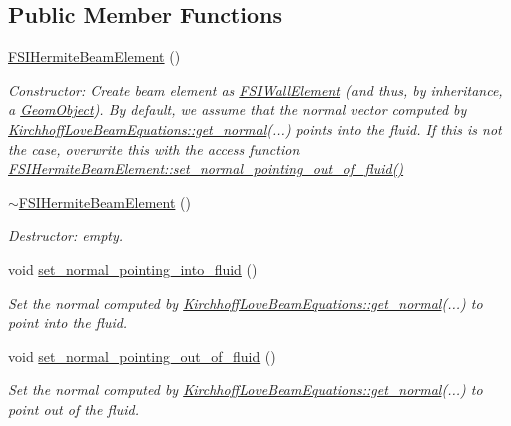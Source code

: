 \subsection*{Public Member Functions}
\begin{DoxyCompactItemize}
\item 
\hyperlink{classoomph_1_1FSIHermiteBeamElement_a40aec23a3e79d2bfcf3a54ab820a7d9b}{F\+S\+I\+Hermite\+Beam\+Element} ()
\begin{DoxyCompactList}\small\item\em Constructor\+: Create beam element as \hyperlink{classoomph_1_1FSIWallElement}{F\+S\+I\+Wall\+Element} (and thus, by inheritance, a \hyperlink{classoomph_1_1GeomObject}{Geom\+Object}). By default, we assume that the normal vector computed by \hyperlink{classoomph_1_1KirchhoffLoveBeamEquations_a963a2ffb3c4008e3b9c175fc1d2d94cc}{Kirchhoff\+Love\+Beam\+Equations\+::get\+\_\+normal}(...) points into the fluid. If this is not the case, overwrite this with the access function \hyperlink{classoomph_1_1FSIHermiteBeamElement_ad509b18e5fd5aae35a86f5c4372d3478}{F\+S\+I\+Hermite\+Beam\+Element\+::set\+\_\+normal\+\_\+pointing\+\_\+out\+\_\+of\+\_\+fluid()} \end{DoxyCompactList}\item 
\hyperlink{classoomph_1_1FSIHermiteBeamElement_a744c7830f87fadc434be57d6fc45bf03}{$\sim$\+F\+S\+I\+Hermite\+Beam\+Element} ()
\begin{DoxyCompactList}\small\item\em Destructor\+: empty. \end{DoxyCompactList}\item 
void \hyperlink{classoomph_1_1FSIHermiteBeamElement_a6acb9e382d0cf3636848e7493c36a3a3}{set\+\_\+normal\+\_\+pointing\+\_\+into\+\_\+fluid} ()
\begin{DoxyCompactList}\small\item\em Set the normal computed by \hyperlink{classoomph_1_1KirchhoffLoveBeamEquations_a963a2ffb3c4008e3b9c175fc1d2d94cc}{Kirchhoff\+Love\+Beam\+Equations\+::get\+\_\+normal}(...) to point into the fluid. \end{DoxyCompactList}\item 
void \hyperlink{classoomph_1_1FSIHermiteBeamElement_ad509b18e5fd5aae35a86f5c4372d3478}{set\+\_\+normal\+\_\+pointing\+\_\+out\+\_\+of\+\_\+fluid} ()
\begin{DoxyCompactList}\small\item\em Set the normal computed by \hyperlink{classoomph_1_1KirchhoffLoveBeamEquations_a963a2ffb3c4008e3b9c175fc1d2d94cc}{Kirchhoff\+Love\+Beam\+Equations\+::get\+\_\+normal}(...) to point out of the fluid. \end{DoxyCompactList}\item 

\end{DoxyCompactItemize}
